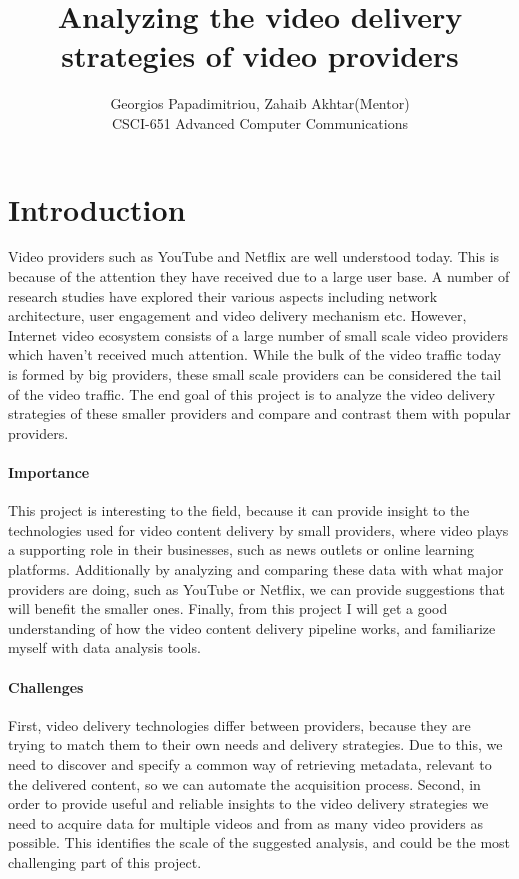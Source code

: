 \documentclass[]{sig-alternate-10pt}
\title{Analyzing the video delivery strategies of video providers}
\author{
            \parbox{\textwidth}{\centering Georgios Papadimitriou, Zahaib Akhtar(Mentor)\\CSCI-651 Advanced Computer Communications \\[1ex]}
        }
\date{}
\begin{document}
\maketitle

\hypertarget{introduction}{%
\section{Introduction}\label{introduction}}

Video providers such as YouTube and Netflix are well understood today.
This is because of the attention they have received due to a large user
base. A number of research studies have explored their various aspects
including network architecture, user engagement and video delivery
mechanism etc. However, Internet video ecosystem consists of a large
number of small scale video providers which haven't received much
attention. While the bulk of the video traffic today is formed by big
providers, these small scale providers can be considered the tail of the
video traffic. The end goal of this project is to analyze the video
delivery strategies of these smaller providers and compare and contrast
them with popular providers.

\hypertarget{importance}{%
\paragraph{Importance}\label{importance}}

This project is interesting to the field, because it can provide insight
to the technologies used for video content delivery by small providers,
where video plays a supporting role in their businesses, such as news
outlets or online learning platforms. Additionally by analyzing and
comparing these data with what major providers are doing, such as
YouTube or Netflix, we can provide suggestions that will benefit the
smaller ones. Finally, from this project I will get a good understanding
of how the video content delivery pipeline works, and familiarize myself
with data analysis tools.

\hypertarget{challenges}{%
\paragraph{Challenges}\label{challenges}}

First, video delivery technologies differ between providers, because
they are trying to match them to their own needs and delivery
strategies. Due to this, we need to discover and specify a common way of
retrieving metadata, relevant to the delivered content, so we can
automate the acquisition process. Second, in order to provide useful and
reliable insights to the video delivery strategies we need to acquire
data for multiple videos and from as many video providers as possible.
This identifies the scale of the suggested analysis, and could be the
most challenging part of this project.
\end{document}
